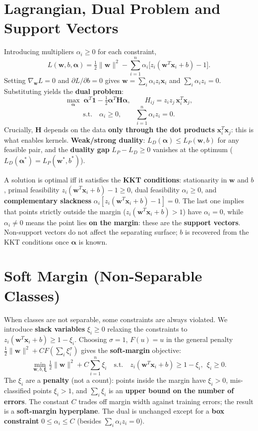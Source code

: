 \section*{Lagrangian, Dual Problem and Support Vectors}

Introducing multipliers $\alpha_i\ge0$ for each constraint,
\[
L(\mathbf{w},b,\boldsymbol\alpha)=\tfrac12\|\mathbf{w}\|^2-\sum_{i=1}^n\alpha_i\big[z_i(\mathbf{w}^T\mathbf{x}_i+b)-1\big].
\]
Setting $\nabla_{\mathbf{w}}L=0$ and $\partial L/\partial b=0$ gives $\mathbf{w}=\sum_i\alpha_iz_i\mathbf{x}_i$ and $\sum_i\alpha_iz_i=0$. Substituting yields the \textbf{dual problem}:
\[
\max_{\boldsymbol\alpha}\;\boldsymbol\alpha^T\mathbf{1}-\tfrac12\boldsymbol\alpha^T\mathbf{H}\boldsymbol\alpha,\qquad H_{ij}=z_iz_j\,\mathbf{x}_i^T\mathbf{x}_j,
\]
\[
\text{s.t.}\quad \alpha_i\ge0,\qquad \sum_{i=1}^n\alpha_iz_i=0 .
\]
Crucially, $\mathbf{H}$ depends on the data \textbf{only through the dot products} $\mathbf{x}_i^T\mathbf{x}_j$: this is what enables kernels. \textbf{Weak/strong duality}: $L_D(\boldsymbol\alpha)\le L_P(\mathbf{w},b)$ for any feasible pair, and the \textbf{duality gap} $L_P-L_D\ge0$ vanishes at the optimum ($L_D(\boldsymbol\alpha^*)=L_P(\mathbf{w}^*,b^*)$).

A solution is optimal iff it satisfies the \textbf{KKT conditions}: stationarity in $\mathbf{w}$ and $b$, primal feasibility $z_i(\mathbf{w}^T\mathbf{x}_i+b)-1\ge0$, dual feasibility $\alpha_i\ge0$, and \textbf{complementary slackness} $\alpha_i[z_i(\mathbf{w}^T\mathbf{x}_i+b)-1]=0$. The last one implies that points strictly outside the margin ($z_i(\mathbf{w}^T\mathbf{x}_i+b)>1$) have $\alpha_i=0$, while $\alpha_i\ne0$ means the point lies \textbf{on the margin}: these are the \textbf{support vectors}. Non-support vectors do not affect the separating surface; $b$ is recovered from the KKT conditions once $\boldsymbol\alpha$ is known.

\section*{Soft Margin (Non-Separable Classes)}

When classes are not separable, some constraints are always violated. We introduce \textbf{slack variables} $\xi_i\ge0$ relaxing the constraints to $z_i(\mathbf{w}^T\mathbf{x}_i+b)\ge1-\xi_i$. Choosing $\sigma=1$, $F(u)=u$ in the general penalty $\frac12\|\mathbf{w}\|^2+CF(\sum_i\xi_i^\sigma)$ gives the \textbf{soft-margin} objective:
\[
\min_{\mathbf{w},b,\boldsymbol\xi}\tfrac12\|\mathbf{w}\|^2+C\sum_{i=1}^n\xi_i\quad\text{s.t.}\quad z_i(\mathbf{w}^T\mathbf{x}_i+b)\ge1-\xi_i,\ \ \xi_i\ge0 .
\]
The $\xi_i$ are a \textbf{penalty} (not a count): points inside the margin have $\xi_i>0$, mis-classified points $\xi_i>1$, and $\sum_i\xi_i$ is an \textbf{upper bound on the number of errors}. The constant $C$ trades off margin width against training errors; the result is a \textbf{soft-margin hyperplane}. The dual is unchanged except for a \textbf{box constraint} $0\le\alpha_i\le C$ (besides $\sum_i\alpha_iz_i=0$).

